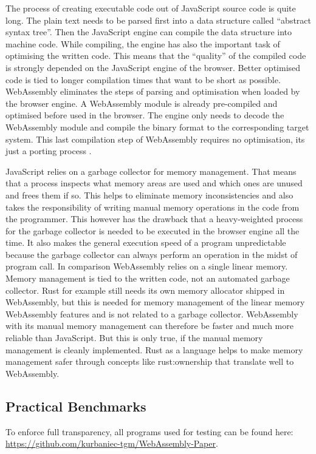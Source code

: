 The process of creating executable code out of JavaScript source code is quite long. The plain text needs to be parsed first into a data structure called ``abstract syntax tree''. Then the JavaScript engine can compile the data structure into machine code. While compiling, the engine has also the important task of optimising the written code. This means that the ``quality'' of the compiled code is strongly depended on the JavaScript engine of the browser. Better optimised code is tied to longer compilation times that want to be short as possible. WebAssembly eliminates the steps of parsing and optimisation when loaded by the browser engine. A WebAssembly module is already pre-compiled and optimised before used in the browser. The engine only needs to decode the WebAssembly module and compile the binary format to the corresponding target system. This last compilation step of WebAssembly requires no optimisation, its just a porting process \cite{wasm:howandwhy}. 

JavaScript relies on a garbage collector for memory management. That means that a process inspects what memory areas are used and which ones are unused and frees them if so. This helps to eliminate memory inconsistencies and also takes the responsibility of writing manual memory operations in the code from the programmer. This however has the drawback that a heavy-weighted process for the garbage collector is needed to be executed in the browser engine all the time. It also makes the general execution speed of a program unpredictable because the garbage collector can always perform an operation in the midst of program call. In comparison WebAssembly relies on a single linear memory. Memory management is tied to the written code, not an automated garbage collector. Rust for example still needs its own memory allocator shipped in WebAssembly, but this is needed for memory management of the linear memory WebAssembly features and is not related to a garbage collector. WebAssembly with its manual memory management can therefore be faster and much more reliable than JavaScript. But this is only true, if the manual memory management is cleanly implemented. Rust as a language helps to make memory management safer through concepts like \gls{rust:ownership} that translate well to WebAssembly. 

\newpage

\subsection{Practical Benchmarks}
To enforce full transparency, all programs used for testing can be found here: \url{https://github.com/kurbaniec-tgm/WebAssembly-Paper}.

